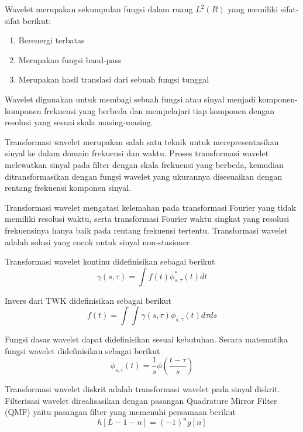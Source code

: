 \documentclass[laporan.tex]{subfiles}
\begin{document}
Wavelet merupakan sekumpulan fungsi dalam ruang $L^2(R)$ yang memiliki sifat-sifat berikut:

\begin{enumerate}
\item Berenergi terbatas
\item Merupakan fungsi band-pass
\item Merupakan hasil translasi dari sebuah fungsi tunggal
\end{enumerate}

Wavelet digunakan untuk membagi sebuah fungsi atau sinyal menjadi komponen-komponen frekuensi yang berbeda dan mempelajari tiap komponen dengan resolusi yang sesuai skala masing-masing.

Transformasi wavelet merupakan salah satu teknik untuk merepresentasikan sinyal ke dalam domain frekuensi dan waktu. Proses transformasi wavelet melewatkan sinyal pada filter dengan skala frekuensi yang berbeda, kemudian ditransformasikan dengan fungsi wavelet yang ukurannya disesuaikan dengan rentang frekuensi komponen sinyal.

Transformasi wavelet mengatasi kelemahan pada transformasi Fourier yang tidak memiliki resolusi waktu, serta transformasi Fourier waktu singkat yang resolusi frekuensinya hanya baik pada rentang frekuensi tertentu. Transformasi wavelet adalah solusi yang cocok untuk sinyal non-stasioner.

Transformasi wavelet kontinu didefinisikan sebagai berikut
\begin{equation}
\gamma(s, \tau) = \int f(t) \phi^{*}_{s,\tau}(t)dt
\end{equation}

Invers dari TWK didefinisikan sebagai berikut
\begin{equation}
f(t) = \int \int \gamma(s,\tau)\phi_{s,\tau}(t)d {\tau}ds
\end{equation}

Fungsi dasar wavelet dapat didefinisikan sesuai kebutuhan. Secara matematika fungsi wavelet didefinisikan sebagai berikut
\begin{equation}
\phi_{s,\tau}(t) = \frac{1}{s}\phi(\frac{t-\tau}{s})
\end{equation}

Transformasi wavelet diskrit adalah transformasi wavelet pada sinyal diskrit. Filterisasi wavelet direalisasikan dengan pasangan Quadrature Mirror Filter (QMF) yaitu pasangan filter yang memenuhi persamaan berikut
\begin{equation}
h[L-1-n]=(-1)^ng[n]
\end{equation}
\end{document}
